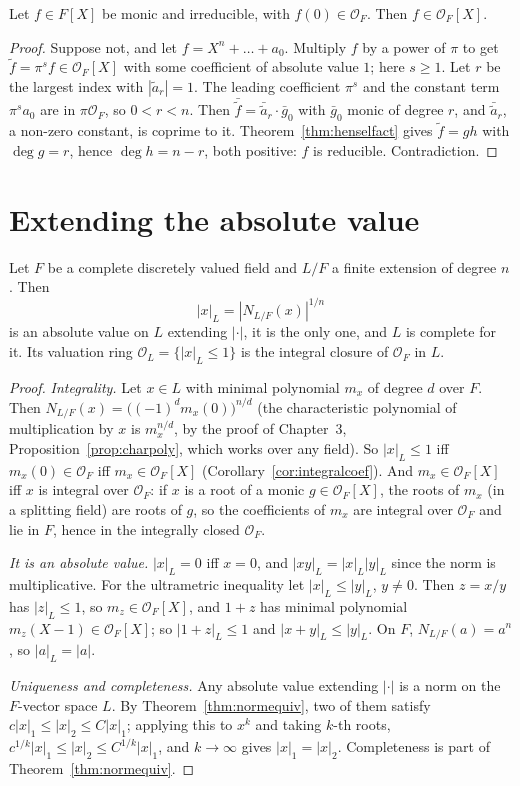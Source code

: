 \begin{corollary}\label{cor:integralcoef}
Let $f\in F[X]$ be monic and irreducible, with $f(0)\in\mathcal O_F$. Then $f\in\mathcal O_F[X]$.
\end{corollary}
\begin{proof}
Suppose not, and let $f=X^n+\dots+a_0$. Multiply $f$ by a power of $\pi$ to get $\tilde f=\pi^sf\in\mathcal O_F[X]$ with some
coefficient of absolute value $1$; here $s\ge1$. Let $r$ be the largest index with $|\tilde a_r|=1$. The leading coefficient
$\pi^s$ and the constant term $\pi^sa_0$ are in $\pi\mathcal O_F$, so $0<r<n$. Then $\bar{\tilde f}=\bar{\tilde a}_r\cdot\bar g_0$
with $\bar g_0$ monic of degree $r$, and $\bar{\tilde a}_r$, a non-zero constant, is coprime to it. Theorem~\ref{thm:henselfact}
gives $\tilde f=gh$ with $\deg g=r$, hence $\deg h=n-r$, both positive: $f$ is reducible. Contradiction.
\end{proof}

\section{Extending the absolute value}

\begin{theorem}\label{thm:extabs}
Let $F$ be a complete discretely valued field and $L/F$ a finite extension of degree $n$. Then
\[
|x|_L=|N_{L/F}(x)|^{1/n}
\]
is an absolute value on $L$ extending $|\cdot|$, it is the only one, and $L$ is complete for it. Its valuation ring $\mathcal
O_L=\{|x|_L\le1\}$ is the integral closure of $\mathcal O_F$ in $L$.
\end{theorem}
\begin{proof}
\emph{Integrality.} Let $x\in L$ with minimal polynomial $m_x$ of degree $d$ over $F$. Then $N_{L/F}(x)=\bigl((-1)^dm_x(0)\bigr)^{n/d}$
(the characteristic polynomial of multiplication by $x$ is $m_x^{n/d}$, by the proof of Chapter~3, Proposition~\ref{prop:charpoly}, which works over any field). So $|x|_L\le1$
iff $m_x(0)\in\mathcal O_F$ iff $m_x\in\mathcal O_F[X]$ (Corollary~\ref{cor:integralcoef}). And $m_x\in\mathcal O_F[X]$ iff $x$
is integral over $\mathcal O_F$: if $x$ is a root of a monic $g\in\mathcal O_F[X]$, the roots of $m_x$ (in a splitting field)
are roots of $g$, so the coefficients of $m_x$ are integral over $\mathcal O_F$ and lie in $F$, hence in the integrally closed
$\mathcal O_F$.

\emph{It is an absolute value.} $|x|_L=0$ iff $x=0$, and $|xy|_L=|x|_L|y|_L$ since the norm is multiplicative. For the
ultrametric inequality let $|x|_L\le|y|_L$, $y\ne0$. Then $z=x/y$ has $|z|_L\le1$, so $m_z\in\mathcal O_F[X]$, and $1+z$ has
minimal polynomial $m_z(X-1)\in\mathcal O_F[X]$; so $|1+z|_L\le1$ and $|x+y|_L\le|y|_L$. On $F$, $N_{L/F}(a)=a^n$, so $|a|_L=|a|$.

\emph{Uniqueness and completeness.} Any absolute value extending $|\cdot|$ is a norm on the $F$-vector space $L$. By
Theorem~\ref{thm:normequiv}, two of them satisfy $c|x|_1\le|x|_2\le C|x|_1$; applying this to $x^k$ and taking $k$-th roots,
$c^{1/k}|x|_1\le|x|_2\le C^{1/k}|x|_1$, and $k\to\infty$ gives $|x|_1=|x|_2$. Completeness is part of
Theorem~\ref{thm:normequiv}.
\end{proof}

